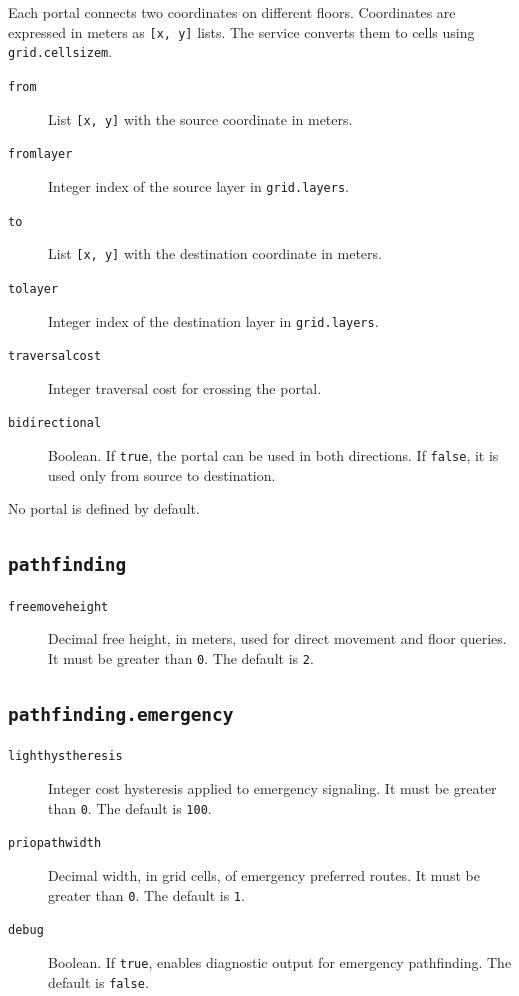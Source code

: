 \documentclass[12pt,a4paper]{report}
\begin{document}
Each portal connects two coordinates on different floors. Coordinates are
expressed in meters as \texttt{[x, y]} lists. The service converts them to cells
using \texttt{grid.cellsizem}.

\begin{description}
\item[\texttt{from}] List \texttt{[x, y]} with the source coordinate in meters.
\item[\texttt{fromlayer}] Integer index of the source layer in
\texttt{grid.layers}.
\item[\texttt{to}] List \texttt{[x, y]} with the destination coordinate in
meters.
\item[\texttt{tolayer}] Integer index of the destination layer in
\texttt{grid.layers}.
\item[\texttt{traversalcost}] Integer traversal cost for crossing the portal.
\item[\texttt{bidirectional}] Boolean. If \texttt{true}, the portal can be used
in both directions. If \texttt{false}, it is used only from source to
destination.
\end{description}

No portal is defined by default.

\subsection{\texttt{pathfinding}}

\begin{description}
\item[\texttt{freemoveheight}] Decimal free height, in meters, used for direct
movement and floor queries. It must be greater than \texttt{0}. The default is
\texttt{2}.
\end{description}

\subsection{\texttt{pathfinding.emergency}}

\begin{description}
\item[\texttt{lighthystheresis}] Integer cost hysteresis applied to emergency
signaling. It must be greater than \texttt{0}. The default is \texttt{100}.
\item[\texttt{priopathwidth}] Decimal width, in grid cells, of emergency
preferred routes. It must be greater than \texttt{0}. The default is \texttt{1}.
\item[\texttt{debug}] Boolean. If \texttt{true}, enables diagnostic output for
emergency pathfinding. The default is \texttt{false}.
\end{description}
\end{document}
